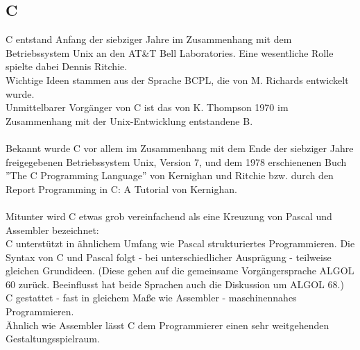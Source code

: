 \subsection{C}

C entstand Anfang der siebziger Jahre im Zusammenhang mit dem Betriebssystem Unix an den AT\&T Bell Laboratories. Eine wesentliche Rolle spielte dabei Dennis Ritchie.\\
Wichtige Ideen stammen aus der Sprache BCPL, die von M. Richards entwickelt wurde.\\
Unmittelbarer Vorgänger von C ist das von K. Thompson 1970 im Zusammenhang mit der Unix-Entwicklung entstandene B.\\
\\
Bekannt wurde C vor allem im Zusammenhang mit dem Ende der siebziger Jahre freigegebenen Betriebssystem Unix, Version 7, und dem 1978 erschienenen Buch ''The C Programming Language'' von Kernighan und Ritchie bzw. durch den Report Programming in C: A Tutorial von Kernighan.\\
\\
Mitunter wird C etwas grob vereinfachend als eine Kreuzung von Pascal und Assembler bezeichnet:\\

C unterstützt in ähnlichem Umfang wie Pascal strukturiertes Programmieren.
Die Syntax von C und Pascal folgt - bei unterschiedlicher Ausprägung - teilweise gleichen Grundideen. (Diese gehen auf die gemeinsame Vorgängersprache ALGOL 60 zurück. Beeinflusst hat beide Sprachen auch die Diskussion um ALGOL 68.)\\
C gestattet - fast in gleichem Maße wie Assembler - maschinennahes Programmieren.\\
Ähnlich wie Assembler lässt C dem Programmierer einen sehr weitgehenden Gestaltungsspielraum. \\

